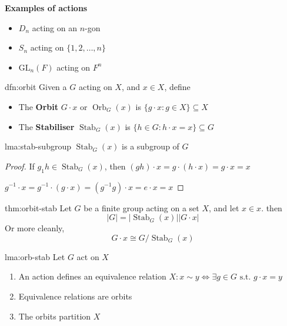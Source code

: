 \documentclass{article}
\DeclareMathOperator{\Orb}{Orb}
\DeclareMathOperator{\Stab}{Stab}
\begin{document}
\textbf{Examples of actions}
\begin{itemize}
    \item $D_{n}$ acting on an $n$-gon
    \item $S_{n}$ acting on $\{1,2,\dots,n\}$
    \item $\mathrm{GL}_{n}(F)$ acting on $F^{n}$
\end{itemize}

\begin{dfn}[Orbits]{dfn:orbit}{}
    Given a $G$ acting on $X$, and $x\in X$, define
    \begin{itemize}
        \item The \textbf{Orbit} $G \cdot x$ or $\Orb_{G}(x)$ is $\{g \cdot x : g\in X\} \subseteq X$
        \item The \textbf{Stabiliser} $\Stab_{G}(x)$ is $\{h\in G : h \cdot x = x\} \subseteq G$
    \end{itemize}
\end{dfn}

\begin{lma}[]{lma:stab-subgroup}{}
    $\Stab_{G}(x)$ is a subgroup of $G$
\end{lma}

\begin{proof}
    If $g_{1}h\in \Stab_{G}(x)$, then $(gh) \cdot x = g \cdot (h \cdot x) = g \cdot x = x$

    $g^{-1} \cdot x = g^{-1} \cdot (g \cdot x) = (g^{-1}g) \cdot x = e \cdot x = x$
\end{proof}

\begin{thm}{thm:orbit-stab}{}
    Let $G$ be a finite group acting on a set $X$, and let $x\in x$. then
    \[\lvert G \rvert = \lvert \Stab_{G}(x) \rvert \lvert G \cdot x \rvert\]
    Or more cleanly,
    \[G \cdot x \cong G / \Stab_{G}(x)\]
\end{thm}

\newpage
\begin{lma}[]{lma:orb-stab}{}
    Let $G$ act on $X$
    \begin{enumerate}
        \item An action defines an equivalence relation $X : x \sim y \iff \exists g\in G \text{ s.t. } g \cdot x = y$
        \item Equivalence relations are orbits
        \item The orbits partition $X$
    \end{enumerate}
\end{lma}
\end{document}
